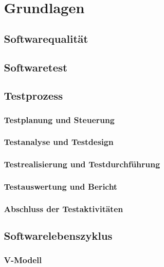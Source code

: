 \chapter{Grundlagen}
\label{sec:grundlagen}


\section{Softwarequalität}
\label{sec:softwarequalität}



\section{Softwaretest}
\label{sec:softwaretest}




\section{Testprozess}
\label{sec:testprozess}



\subsection{Testplanung und Steuerung}
\label{subsec:testplanung_und_steuerung}


\subsection{Testanalyse und Testdesign}
\label{subsec:testanalyse_und_design}


\subsection{Testrealisierung und Testdurchführung}
\label{subsec:testrealisierung_und_durchführung}

\subsection{Testauswertung und Bericht}
\label{subsec:testauswertung_und_bericht}


\subsection{Abschluss der Testaktivitäten}
\label{subsec:abschluss_der_testaktivitäten}



\section{Softwarelebenszyklus}
\label{sec:softwarelebenszyklus}



\subsection{V-Modell}
\label{subsec:vmodell}

